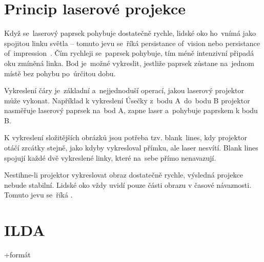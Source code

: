 
\section{Princip laserové projekce}\label{sec:projection-princip}
Když se~laserový paprsek pohybuje dostatečně rychle, lidské oko ho~vnímá jako spojitou linku světla -- tomuto jevu se~říká persistance of~vision nebo persistance of~impression~\cite{persistance-of-vision}.
Čím rychleji se~paprsek pohybuje, tím méně intenzivní připadá oku zmíněná linka. Bod je~možné vykreslit, jestliže paprsek zůstane na~jednom místě bez pohybu po~úrčitou dobu.

Vykreslení čáry je~základní a~nejjednoduší operací, jakou laserový projektor může vykonat. Například k vykreslení Úsečky z~bodu A~do~bodu B projektor nasměřuje laserový paprsek na~bod A, zapne laser a~pohybuje paprskem k bodu B.

K vykreslení složitějších obrázků jsou potřeba tzv. blank\ lines, kdy projektor otáčí zrcátky stejně, jako kdyby vykresloval přímku, ale laser nesvítí. Blank lines spojují každé dvě vykreslené linky, které na~sebe přímo nenavazují.

Nestihne-li projektor vykreslovat obraz dostatečně rychle, výsledná projekce nebude stabilní. Lidské oko vždy uvidí pouze části obrazu v časové návaznosti. Tomuto jevu se~říká .

\section{ILDA}\label{sec:ilda}

+formát